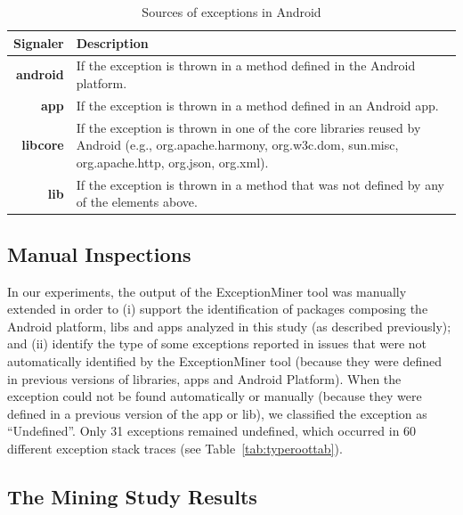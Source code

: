 
\begin{table}
  \centering
  \scriptsize
  \begin{tabular}{rp{29em}}
    \hline
    \bfseries{Signaler} & \bfseries{Description} \\
    \hline
    \bfseries{android} & If the exception is thrown in a method defined in the Android platform.\\
    \bfseries{app}     & If the exception is thrown in a method defined in an Android app.\\
    \bfseries{libcore} & If the exception is thrown in one of the core libraries reused by Android (e.g., org.apache.harmony, org.w3c.dom, sun.misc, org.apache.http, org.json, org.xml). \\
    \bfseries{lib}     & If the exception is thrown in a method that was not defined by any of the elements above.\\
    \hline
  \end{tabular}
  \caption{Sources of exceptions in Android}
  \label{tab:signalers}
\end{table}

\subsection{Manual Inspections}
\label{sec:manual}
In our experiments, the output of the ExceptionMiner tool was manually extended
in order to 
(i) support the identification of packages composing the Android platform, 
libs and apps analyzed in this study (as described previously); and (ii)  
identify the type of some exceptions reported in issues 
that were not automatically identified by the ExceptionMiner tool
(because they were defined in previous versions of libraries,
apps and Android Platform). When the exception could not be  
found automatically or manually (because they were defined in a previous version
of the app or lib), we classified the exception as ``Undefined''.  Only 31 exceptions 
remained undefined, which occurred in 60 different exception stack traces (see Table~\ref{tab:typeroottab}).

\subsection{The Mining Study Results}
\label{sec:result}


